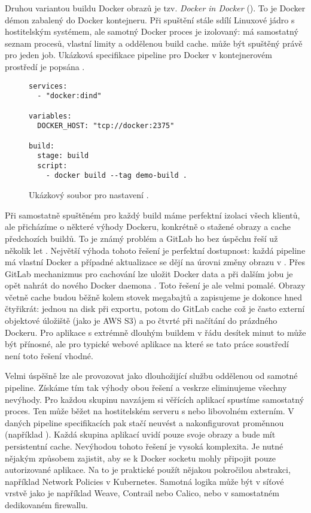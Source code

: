         Druhou variantou buildu Docker obrazů je tzv. \textit{Docker in Docker} (). To je Docker démon zabalený do Docker kontejneru. Při spuštění stále sdílí Linuxové jádro s hostitelským systémem, ale samotný Docker proces je izolovaný: má samostatný seznam procesů, vlastní limity a oddělenou build cache.  může být spuštěný právě pro jeden job. Ukázková specifikace pipeline pro Docker v kontejnerovém prostředí je popsána .

        \begin{figure}[hb]
            \begin{verbatim}
services:
  - "docker:dind"

variables:
  DOCKER_HOST: "tcp://docker:2375"

build:
  stage: build
  script:
    - docker build --tag demo-build .
            \end{verbatim}
            \caption{Ukázkový soubor  pro nastavení .}
            \label{fig:gitlab-dind}
        \end{figure}

        Při samostatně spuštěném  pro každý build máme perfektní izolaci všech klientů, ale přicházíme o některé výhody Dockeru, konkrétně o stažené obrazy a cache předchozích buildů. To je známý problém a GitLab ho bez úspěchu řeší už několik let \cite{gitlab-docker-artifact-caching}. Největší výhoda tohoto řešení je perfektní dostupnost: každá pipeline má vlastní Docker a případné aktualizace se dějí na úrovni změny obrazu v . Přes GitLab mechanizmus pro cachování lze uložit Docker data a při dalším jobu je opět nahrát do nového Docker daemona \cite{patel-docker-cache}. Toto řešení je ale velmi pomalé. Obrazy včetně cache budou běžně kolem stovek megabajtů a zapisujeme je dokonce hned čtyřikrát: jednou na disk při exportu, potom do GitLab cache což je často externí objektové úložiště (jako je AWS S3) a po čtvrté při načítání do prázdného Dockeru. Pro aplikace s extrémně dlouhým buildem v řádu desítek minut to může být přínosné, ale pro typické webové aplikace na které se tato práce soustředí není toto řešení vhodné.

        Velmi úspěšně lze ale  provozovat jako dlouhožijící službu oddělenou od samotné \CI pipeline. Získáme tím tak výhody obou řešení a veskrze eliminujeme všechny nevýhody. Pro každou skupinu navzájem si věřících aplikací spustíme samostatný  proces. Ten může běžet na hostitelském serveru s \CI nebo libovolném externím. V daných pipeline specifikacích pak stačí neuvést  a nakonfigurovat proměnnou  (například ). Každá skupina aplikací uvidí pouze svoje obrazy a bude mít persistentní cache. Nevýhodou tohoto řešení je vysoká komplexita. Je nutné nějakým způsobem zajistit, aby se k Docker socketu mohly připojit pouze autorizované aplikace. Na to je praktické použít nějakou pokročilou abstrakci, například Network Policies v Kubernetes. Samotná  logika může být v síťové vrstvě jako je například Weave, Contrail nebo Calico, nebo v samostatném dedikovaném firewallu.

